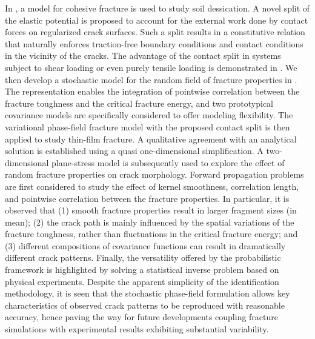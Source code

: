 In , a model for cohesive fracture is used to study soil dessication. A novel split of the elastic potential is proposed to account for the external work done by contact forces on regularized crack surfaces. Such a split results in a constitutive relation that naturally enforces traction-free boundary conditions and contact conditions in the vicinity of the cracks. The advantage of the contact split in systems subject to shear loading or even purely tensile loading is demonstrated in . We then develop a stochastic model for the random field of fracture properties in . The representation enables the integration of pointwise correlation between the fracture toughness and the critical fracture energy, and two prototypical covariance models are specifically considered to offer modeling flexibility.
The variational phase-field fracture model with the proposed contact split is then applied to study thin-film fracture. A qualitative agreement with an analytical solution is established using a quasi one-dimensional simplification. A two-dimensional plane-stress model is subsequently used to explore the effect of random fracture properties on crack morphology. Forward propagation problems are first considered to study the effect of kernel smoothness, correlation length, and pointwise correlation between the fracture properties. In particular, it is observed that (1) smooth fracture properties result in larger fragment sizes (in mean); (2) the crack path is mainly influenced by the spatial variations of the fracture toughness, rather than fluctuations in the critical fracture energy; and (3) different compositions of covariance functions can result in dramatically different crack patterns. Finally, the versatility offered by the probabilistic framework is highlighted by solving a statistical inverse problem based on physical experiments. Despite the apparent simplicity of the identification methodology, it is seen that the stochastic phase-field formulation allows key characteristics of observed crack patterns to be reproduced with reasonable accuracy, hence paving the way for future developments coupling fracture simulations with experimental results exhibiting substantial variability.

